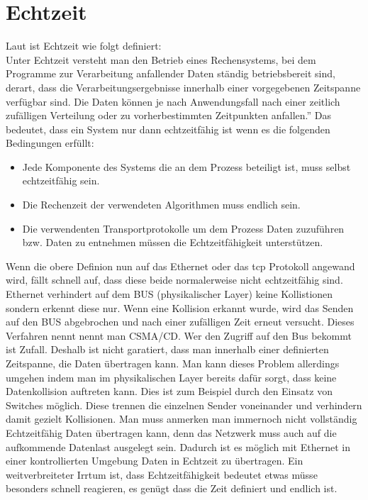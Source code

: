 \section{Echtzeit}
Laut \citet{Scholz:2005} ist Echtzeit wie folgt definiert:\\
\glqq{}Unter Echtzeit versteht man den Betrieb
eines Rechensystems, bei dem Programme zur Verarbeitung
anfallender Daten ständig betriebsbereit sind, derart, dass die
Verarbeitungsergebnisse innerhalb einer vorgegebenen Zeitspanne
verfügbar sind. Die Daten können je nach Anwendungsfall nach
einer zeitlich zufälligen Verteilung oder zu vorherbestimmten
Zeitpunkten anfallen.''
Das bedeutet, dass ein System nur dann echtzeitfähig ist wenn es die folgenden Bedingungen erfüllt:
\begin{itemize}
  \item Jede Komponente des Systems die an dem Prozess beteiligt ist, muss selbst echtzeitfähig sein.
  \item Die Rechenzeit der verwendeten Algorithmen muss endlich sein.
  \item Die verwendenten Transportprotokolle um dem Prozess Daten zuzuführen bzw. Daten zu entnehmen müssen die Echtzeitfähigkeit unterstützen.
\end{itemize}
Wenn die obere Definion nun auf das Ethernet oder das \ac{tcp} Protokoll angewand wird, fällt schnell auf, 
dass diese beide normalerweise nicht echtzeitfähig sind.
Ethernet verhindert auf dem BUS (physikalischer Layer) keine Kollistionen sondern erkennt diese nur. 
Wenn eine Kollision erkannt wurde, 
wird das Senden auf den BUS abgebrochen und nach einer zufälligen Zeit erneut versucht.
Dieses Verfahren nennt nennt man \ac{CSMA/CD}. 
Wer den Zugriff auf den Bus bekommt ist Zufall.
Deshalb ist nicht garatiert, dass man innerhalb einer definierten Zeitspanne, die Daten übertragen kann.
Man kann dieses Problem allerdings umgehen indem man im physikalischen Layer bereits dafür sorgt, 
dass keine Datenkollision auftreten kann. Dies ist zum Beispiel durch den Einsatz von Switches möglich.
Diese trennen die einzelnen Sender voneinander und verhindern damit gezielt Kollisionen.
Man muss anmerken man immernoch nicht vollständig Echtzeitfähig Daten übertragen kann, 
denn das Netzwerk muss auch auf die aufkommende Datenlast ausgelegt sein.
Dadurch ist es möglich mit Ethernet in einer kontrollierten Umgebung Daten in Echtzeit zu übertragen.
Ein weitverbreiteter Irrtum ist, dass Echtzeitfähigkeit bedeutet etwas müsse besonders schnell reagieren, 
es genügt dass die Zeit definiert und endlich ist.